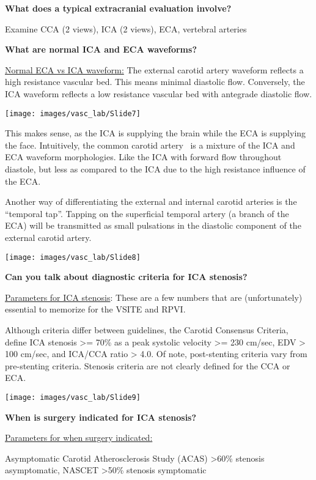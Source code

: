 \documentclass[
]{book}
\begin{document}
\textbf{What does a typical extracranial evaluation involve?}

Examine CCA (2 views), ICA (2 views), ECA, vertebral arteries

\textbf{What are normal ICA and ECA waveforms?}

\uline{Normal ECA vs ICA waveform:} The external carotid artery
waveform reflects a high resistance vascular bed. This means minimal
diastolic flow. Conversely, the ICA waveform reflects a low resistance
vascular bed with antegrade diastolic flow.

\texttt{[image: images/vasc\_lab/Slide7]}

This makes sense, as the ICA is supplying the brain while the ECA is
supplying the face. Intuitively, the common carotid artery~ is a mixture
of the ICA and ECA waveform morphologies. Like the ICA with forward flow
throughout diastole, but less as compared to the ICA due to the high
resistance influence of the ECA.

Another way of differentiating the external and internal carotid
arteries is the ``temporal tap''. Tapping on the superficial temporal
artery (a branch of the ECA) will be transmitted as small pulsations in
the diastolic component of the external carotid artery.\citep{pellerito2019, size2013}

\texttt{[image: images/vasc\_lab/Slide8]}

\textbf{Can you talk about diagnostic criteria for ICA stenosis?}

\uline{Parameters for ICA stenosis}: These are a few numbers that
are (unfortunately) essential to memorize for the VSITE and RPVI.

Although criteria differ between guidelines, the Carotid Consensus
Criteria, define ICA stenosis \textgreater= 70\% as a peak systolic velocity \textgreater=
230 cm/sec, EDV \textgreater{} 100 cm/sec, and ICA/CCA ratio \textgreater{} 4.0. Of note,
post-stenting criteria vary from pre-stenting criteria. Stenosis
criteria are not clearly defined for the CCA or ECA.

\texttt{[image: images/vasc\_lab/Slide9]}

\textbf{When is surgery indicated for ICA stenosis?}

\uline{Parameters for when surgery indicated:}

Asymptomatic Carotid Atherosclerosis Study (ACAS) \textgreater60\% stenosis
asymptomatic, NASCET \textgreater50\% stenosis symptomatic
\end{document}
